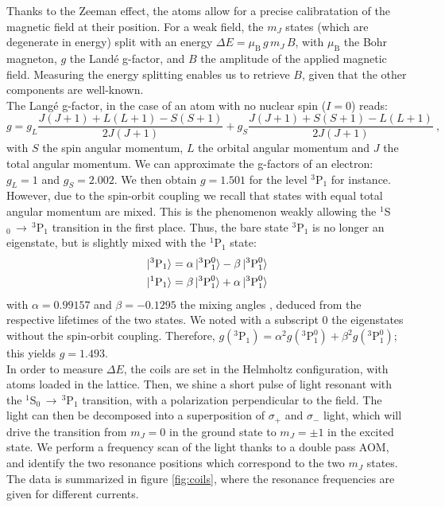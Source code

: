 \documentclass[11pt]{article}
\newcommand{\mathsc}[1]{\mathrm{\scriptscriptstyle {#1}}}
\numberwithin{equation}{section}
\numberwithin{figure}{section}
\begin{document}
Thanks to the Zeeman effect, the atoms allow for a precise calibratation of the magnetic field at their position. For a weak field, the $m_J$ states (which are degenerate in energy) split with an energy $\Delta E = \mu_\mathsc{B}\, g \,  m_J \,B$, with  $\mu_\mathsc{B}$ the Bohr magneton, $g$ the Landé g-factor, and $B$ the amplitude of the applied magnetic field. Measuring the energy splitting enables us to retrieve $B$, given that the other components are well-known. \\
The Langé g-factor, in the case of an atom with no nuclear spin ($I=0$) reads:
%
\begin{equation}
	g = g_L \frac{J(J+1)+L(L+1)-S(S+1)}{2 J(J+1)} + g_S \frac{J(J+1)+S(S+1)-L(L+1)}{2 J(J+1)}~,
\end{equation}
%
with $S$ the spin angular momentum, $L$ the orbital angular momentum and $J$ the total angular momentum. We can approximate the g-factors of an electron: $g_L = 1$ and $g_S=2.002$. We then obtain $g = 1.501$ for the level $^3$P$_1$ for instance. However, due to the spin-orbit coupling we recall that states with equal total angular momentum are mixed. This is the phenomenon weakly allowing the $^1$S$_0 \, \rightarrow \, ^3$P$_1$ transition in the first place. Thus, the bare state $^3$P$_1$ is no longer an eigenstate, but is slightly mixed with the $^1$P$_1$ state:
%
\begin{align}
 	\ket*{^3\text{P}_1} & = \alpha \ket*{^3\text{P}_1^0} - \beta \ket*{^3\text{P}_1^0} \\
  	\ket*{^1\text{P}_1} & = \beta \ket*{^3\text{P}_1^0} + \alpha \ket*{^3\text{P}_1^0} 
\end{align}
%
with $\alpha=0.99157$ and $\beta=-0.1295$ the mixing angles \citep{2019_riegger}, deduced from the respective lifetimes of the two states. We noted with a subscript $0$ the eigenstates without the spin-orbit coupling. Therefore, $g(^3\text{P}_1) = \alpha^2 g(^3\text{P}_1^0) + \beta^2 g(^3\text{P}_1^0)$; this yields $g = 1.493$. \\

In order to measure $\Delta E$, the coils are set in the Helmholtz configuration, with atoms loaded in the lattice. Then, we shine a short pulse of light resonant with the $^1$S$_0 \, \rightarrow \, ^3$P$_1$ transition, with a polarization perpendicular to the field. The light can then be decomposed into a superposition of $\sigma_+$ and $\sigma_-$ light, which will drive the transition from $m_J = 0$ in the ground state to $m_J = \pm 1$ in the excited state. We perform a frequency scan of the light thanks to a double pass AOM, and identify the two resonance positions which correspond to the two $m_J$ states. The data is summarized in figure \ref{fig:coils}, where the resonance frequencies are given for different currents.
\end{document}
